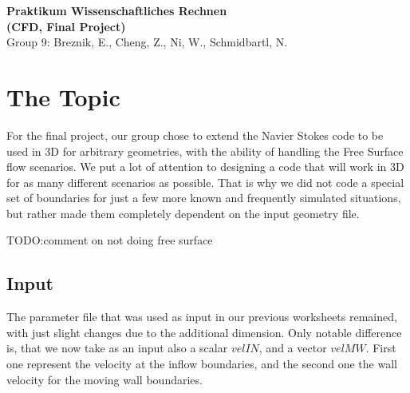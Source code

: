 \documentclass[a4paper, 12pt]{article}
\begin{document}
\begin{center}
{\LARGE \bf Praktikum Wissenschaftliches Rechnen \\ \vspace{0.2cm} (CFD, Final Project)}\\
\vspace{0.6cm}
{\small Group 9: Breznik, E., Cheng, Z., Ni, W., Schmidbartl, N.}
\end{center}
\normalfont
\section{The Topic}
For the final project, our group chose to extend the Navier Stokes code to be used in 3D for arbitrary geometries, with the ability of handling
the Free Surface flow scenarios.
We put a lot of attention to designing a code that will work in 3D for as many different scenarios as possible. That is why we did not code a
special set of boundaries for just a few more known and frequently simulated situations, but rather made them completely dependent on the input
geometry file.

TODO:comment on not doing free surface
\subsection{Input}
The parameter file that was used as input in our previous worksheets remained, with just slight changes due to the additional dimension.
Only notable difference is, that we now take as an input also a scalar $velIN$, and a vector $velMW$. First one represent the velocity at the
inflow boundaries, and the second one the wall velocity for the moving wall boundaries. %
\end{document}
